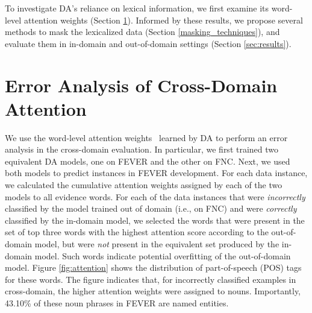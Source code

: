 To investigate DA's reliance on lexical information, we first examine its word-level attention weights (Section \ref{attention_analysis}).
Informed by these results, we propose several methods to mask the lexicalized data (Section \ref{masking_techniques}), and evaluate them in in-domain and  out-of-domain settings (Section \ref{sec:results}).



\section{Error Analysis of Cross-Domain Attention} \label{attention_analysis}


We use the word-level attention weights~\cite{bahdanau2014neural} learned by DA to perform  an error analysis in the cross-domain evaluation.
In particular, we first trained two equivalent DA models, one on FEVER and the other on FNC.
Next, we used both models to predict instances in FEVER development. For each data instance, we calculated the cumulative attention weights assigned by each of the two models to all evidence words.
For each of the data instances that were {\em incorrectly} classified by the model trained out of domain (i.e., on FNC) and were {\em correctly} classified by the in-domain model,
we  selected the words that were present in the set of top three words with the highest attention score according to the out-of-domain model, but were {\em not} present in the equivalent set produced by the in-domain model. Such words indicate potential overfitting of the out-of-domain model.
Figure \ref{fig:attention} shows the distribution of part-of-speech (POS) tags for these words. The figure indicates that, for incorrectly classified examples in cross-domain, the higher attention weights were assigned to nouns.
Importantly, 43.10\% of these noun phrases in FEVER are named entities.



